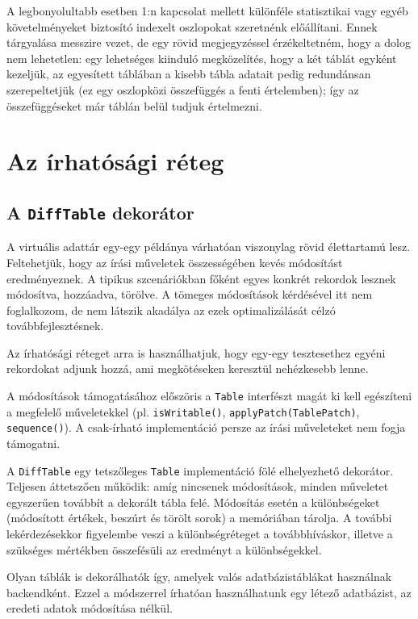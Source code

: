 \documentclass[
    parspace,
    noindent,
    nohyp,
]{elteiktdk}[2023/04/10]
\begin{document}
A legbonyolultabb esetben 1:n kapcsolat mellett különféle statisztikai
vagy egyéb követelményeket biztosító indexelt oszlopokat szeretnénk előállítani.
Ennek tárgyalása messzire vezet,
de egy rövid megjegyzéssel érzékeltetném, hogy a dolog nem lehetetlen:
egy lehetséges kiinduló megközelítés, hogy a két táblát egyként kezeljük,
az egyesített táblában a kisebb tábla adatait pedig redundánsan szerepeltetjük
(ez egy oszlopközi összefüggés a fenti értelemben);
így az összefüggéseket már táblán belül tudjuk értelmezni.


\section{Az írhatósági réteg}

\subsection{A \texttt{DiffTable} dekorátor}

A virtuális adattár egy-egy példánya várhatóan viszonylag rövid élettartamú lesz.
Feltehetjük, hogy az írási műveletek összességében kevés módosítást eredményeznek.
A tipikus szcenáriókban főként egyes konkrét rekordok lesznek módosítva, hozzáadva, törölve.
A tömeges módosítások kérdésével itt nem foglalkozom,
de nem látszik akadálya az ezek optimalizálását célzó továbbfejlesztésnek.

Az írhatósági réteget arra is használhatjuk,
hogy egy-egy tesztesethez egyéni rekordokat adjunk hozzá,
ami megkötéseken keresztül nehézkesebb lenne.

A módosítások támogatásához előszöris a \texttt{Table} interfészt magát
ki kell egészíteni a megfelelő műveletekkel
(pl. \texttt{isWritable()}, \texttt{applyPatch(TablePatch)}, \texttt{sequence()}).
A csak-írható implementáció persze az írási műveleteket nem fogja támogatni.

A \texttt{DiffTable} egy tetszőleges \texttt{Table} implementáció fölé elhelyezhető dekorátor.
Teljesen áttetszően működik: amíg nincsenek módosítások,
minden műveletet egyszerűen továbbít a dekorált tábla felé.
Módosítás esetén a különbségeket (módosított értékek, beszúrt és törölt sorok) a memóriában tárolja.
A további lekérdezésekkor figyelembe veszi a különbségréteget a továbbhíváskor,
illetve a szükséges mértékben összefésüli az eredményt a különbségekkel.

Olyan táblák is dekorálhatók így, amelyek valós adatbázistáblákat használnak backendként.
Ezzel a módszerrel írhatóan használhatunk egy létező adatbázist,
az eredeti adatok módosítása nélkül.
\end{document}
